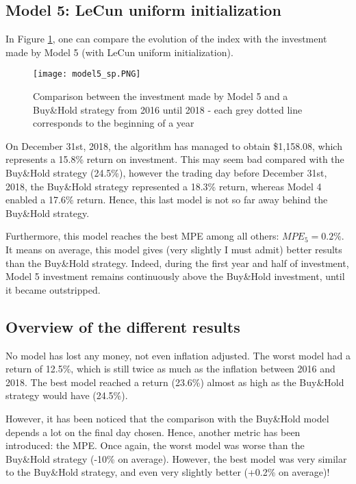 \documentclass[11pt]{article}
\begin{document}
\begin{onehalfspace}
\subsection{Model 5: LeCun uniform initialization}

In Figure \ref{fig:plot_model5}, one can compare the evolution of the index with the investment made by Model 5 (with LeCun uniform initialization).

\begin{figure}[h!]
    \centering
    \texttt{[image: model5\_sp.PNG]}
    \caption{Comparison between the investment made by Model 5 and a Buy\&Hold strategy from 2016 until 2018 - each grey dotted line corresponds to the beginning of a year}
\label{fig:plot_model5}
\end{figure}

On December 31st, 2018, the algorithm has managed to obtain \$1,158.08, which represents a 15.8\% return on investment. This may seem bad compared with the Buy\&Hold strategy (24.5\%), however the trading day before December 31st, 2018, the Buy\&Hold strategy represented a 18.3\% return, whereas Model 4 enabled a 17.6\% return. Hence, this last model is not so far away behind the Buy\&Hold strategy. 

Furthermore, this model reaches the best MPE among all others: $MPE_5 = 0.2\%$. It means on average, this model gives (very slightly I must admit) better results than the Buy\&Hold strategy. Indeed, during the first year and half of investment, Model 5 investment remains continuously above the Buy\&Hold investment, until it became outstripped. 

\subsection{Overview of the different results}

No model has lost any money, not even inflation adjusted. The worst model had a return of 12.5\%, which is still twice as much as the inflation between 2016 and 2018. The best model reached a return (23.6\%) almost as high as the Buy\&Hold strategy would have (24.5\%).

However, it has been noticed that the comparison with the Buy\&Hold model depends a lot on the final day chosen. Hence, another metric has been introduced: the MPE. Once again, the worst model was worse than the Buy\&Hold strategy (-10\% on average). However, the best model was very similar to the Buy\&Hold strategy, and even very slightly better (+0.2\% on average)!


\end{onehalfspace}
\end{document}
